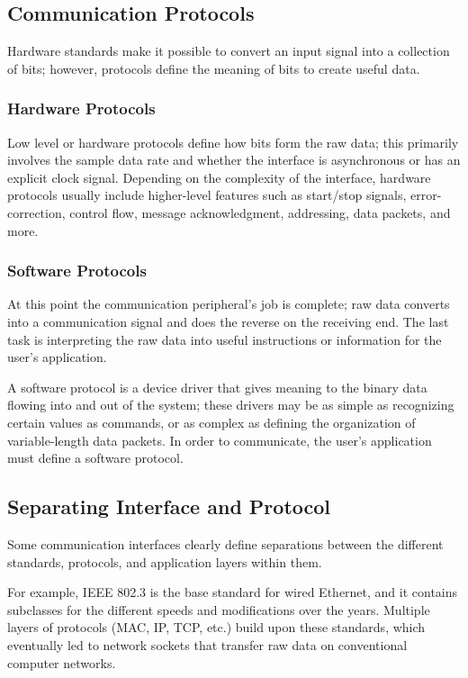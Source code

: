 \documentclass[openany,11pt,fleqn]{book} %
\begin{document}
\subsection{Communication Protocols}
Hardware standards make it possible to convert an input signal into a collection of bits; however, protocols define the meaning of bits to create useful data. 

\subsubsection{Hardware Protocols}
Low level or hardware protocols define how bits form the raw data; this primarily involves the sample data rate and whether the interface is asynchronous or has an explicit clock signal.
Depending on the complexity of the interface, hardware protocols usually include higher-level features such as start/stop signals, error-correction, control flow, message acknowledgment, addressing, data packets, and more.

\subsubsection{Software Protocols}	
At this point the communication peripheral's job is complete; raw data converts into a communication signal and does the reverse on the receiving end. The last task is interpreting the raw data into useful instructions or information for the user's application.

A software protocol is a device driver that gives meaning to the binary data flowing into and out of the system; these drivers may be as simple as recognizing certain values as commands, or as complex as defining the organization of variable-length data packets.  In order to communicate, the user's application must define a software protocol. 

\subsection{Separating Interface and Protocol}
   
Some communication interfaces clearly define separations between the different standards, protocols, and application layers within them. 

For example, IEEE 802.3 is the base standard for wired Ethernet, and it contains subclasses for the different speeds and modifications over the years. Multiple layers of protocols (MAC, IP, TCP, etc.) build upon these standards, which eventually led to network sockets that transfer raw data on conventional computer networks. 
\end{document}
